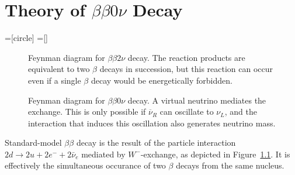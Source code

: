 \renewcommand{\thechapter}{1}
\chapter{Theory of $\beta\beta 0\nu$ Decay}

=[circle]
=[]

\begin{figure}
\caption{Feynman diagram for $\beta\beta 2 \nu$ decay.  The reaction products are equivalent to two $\beta$ decays in succession, but this reaction can occur even if a single $\beta$ decay would be energetically forbidden.}
\label{fig:FeynmanBetaBeta2Nu}
\end{figure}

\begin{figure}
\caption{Feynman diagram for $\beta\beta 0 \nu$ decay.  A virtual neutrino mediates the exchange.  This is only possible if $\overline{\nu}_R$ can oscillate to $\nu_L$, and the interaction that induces this oscillation also generates neutrino mass.}
\label{fig:FeynmanBetaBeta0Nu}
\end{figure}

Standard-model $\beta\beta$ decay is the result of the particle interaction $2d \rightarrow 2u + 2e^- + 2\bar{\nu}_e$ mediated by $W^-$-exchange, as depicted in Figure~\ref{fig:FeynmanBetaBeta2Nu}.  It is effectively the simultaneous occurance of two $\beta$ decays from the same nucleus.

